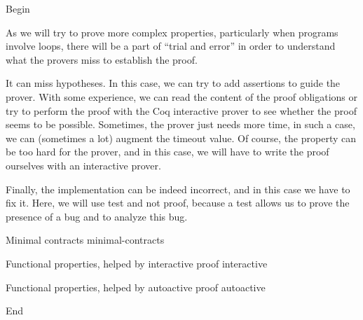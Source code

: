 Begin

As we will try to prove more complex properties, particularly when
programs involve loops, there will be a part of ``trial and error'' in
order to understand what the provers miss to establish the proof.

It can miss hypotheses. In this case, we can try to add assertions to
guide the prover. With some experience, we can read the content of the
proof obligations or try to perform the proof with the Coq interactive
prover to see whether the proof seems to be possible. Sometimes, the
prover just needs more time, in such a case, we can (sometimes a lot)
augment the timeout value. Of course, the property can be too hard for
the prover, and in this case, we will have to write the proof ourselves
with an interactive prover.

Finally, the implementation can be indeed incorrect, and in this case we
have to fix it. Here, we will use test and not proof, because a test
allows us to prove the presence of a bug and to analyze this bug.


\begin{levelTwo}
  {Minimal contracts}
  {minimal-contracts}
\end{levelTwo}

\begin{levelTwo}
  {Functional properties, helped by interactive proof}
  {interactive}
\end{levelTwo}

\begin{levelTwo}
  {Functional properties, helped by autoactive proof}
  {autoactive}
\end{levelTwo}


\horizontalLine
\newpage

End
